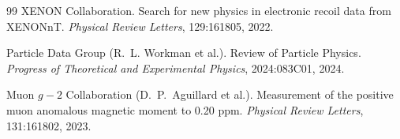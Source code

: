 \documentclass[11pt,a4paper]{amsart}
\theoremstyle{plain}
\theoremstyle{definition}
\begin{document}
\begin{thebibliography}{99}
XENON Collaboration.
\newblock Search for new physics in electronic recoil data from XENONnT.
\newblock \emph{Physical Review Letters}, 129:161805, 2022.

Particle Data Group (R.~L. Workman et al.).
\newblock Review of Particle Physics.
\newblock \emph{Progress of Theoretical and Experimental Physics}, 2024:083C01, 2024.

Muon $g-2$ Collaboration (D.~P.~Aguillard et al.).
\newblock Measurement of the positive muon anomalous magnetic moment to 0.20 ppm.
\newblock \emph{Physical Review Letters}, 131:161802, 2023.

\end{thebibliography}
\end{document}
